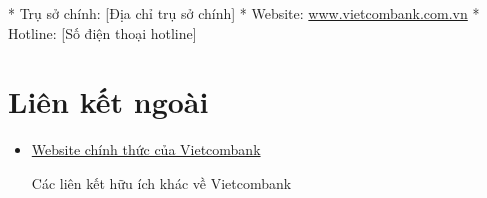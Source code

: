 \documentclass{article}
\begin{document}
* Trụ sở chính: [Địa chỉ trụ sở chính]
* Website: \href{https://www.vietcombank.com.vn}{www.vietcombank.com.vn}
* Hotline: [Số điện thoại hotline]

\section{Liên kết ngoài}

\begin{itemize}
    \item \href{https://www.vietcombank.com.vn}{Website chính thức của Vietcombank}
    \item [Các liên kết hữu ích khác về Vietcombank]
\end{itemize}
\end{document}
